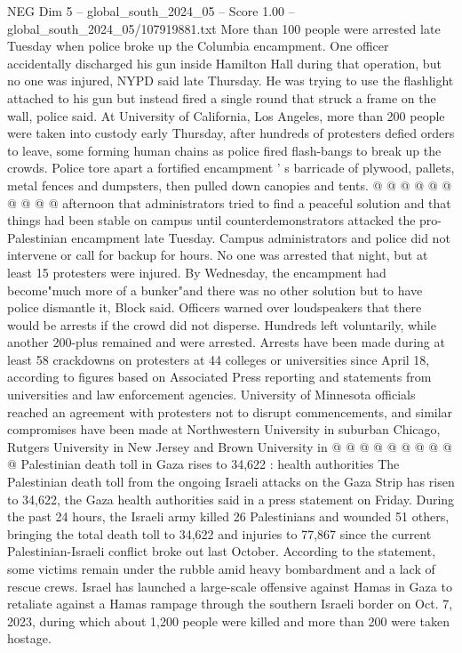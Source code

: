 \begin{textsample}{NEG Dim 5 – global\_south\_2024\_05 – Score 1.00 – global\_south\_2024\_05/107919881.txt}
More than 100 people were arrested late Tuesday when police broke up the Columbia encampment.
One officer accidentally discharged his gun inside Hamilton Hall during that operation, but no one was injured, NYPD said late Thursday.
He was trying to use the flashlight attached to his gun but instead fired a single round that struck a frame on the wall, police said.
At University of California, Los Angeles, more than 200 people were taken into custody early Thursday, after hundreds of protesters defied orders to leave, some forming human chains as police fired flash-bangs to break up the crowds.
Police tore apart a fortified encampment ' s barricade of plywood, pallets, metal fences and dumpsters, then pulled down canopies and tents. @ @ @ @ @ @ @ @ @ @ afternoon that administrators tried to find a peaceful solution and that things had been stable on campus until counterdemonstrators attacked the pro-Palestinian encampment late Tuesday.
Campus administrators and police did not intervene or call for backup for hours.
No one was arrested that night, but at least 15 protesters were injured.
By Wednesday, the encampment had become"much more of a bunker"and there was no other solution but to have police dismantle it, Block said.
Officers warned over loudspeakers that there would be arrests if the crowd did not disperse.
Hundreds left voluntarily, while another 200-plus remained and were arrested.
Arrests have been made during at least 58 crackdowns on protesters at 44 colleges or universities since April 18, according to figures based on Associated Press reporting and statements from universities and law enforcement agencies.
University of Minnesota officials reached an agreement with protesters not to disrupt commencements, and similar compromises have been made at Northwestern University in suburban Chicago, Rutgers University in New Jersey and Brown University in @ @ @ @ @ @ @ @ @ @ Palestinian death toll in Gaza rises to 34,622 : health authorities The Palestinian death toll from the ongoing Israeli attacks on the Gaza Strip has risen to 34,622, the Gaza health authorities said in a press statement on Friday.
During the past 24 hours, the Israeli army killed 26 Palestinians and wounded 51 others, bringing the total death toll to 34,622 and injuries to 77,867 since the current Palestinian-Israeli conflict broke out last October.
According to the statement, some victims remain under the rubble amid heavy bombardment and a lack of rescue crews.
Israel has launched a large-scale offensive against Hamas in Gaza to retaliate against a Hamas rampage through the southern Israeli border on Oct. 7, 2023, during which about 1,200 people were killed and more than 200 were taken hostage.

\end{textsample}
